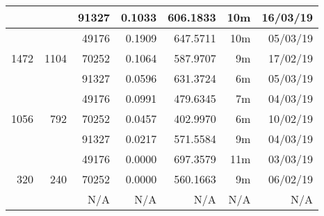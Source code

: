 \begin{center}
\begin{tabular}{ r r r | r | r r r }
  & & 91327 & 0.1033 & 606.1833 & 10m & 16/03/19 \\
  \hline
  \multirow{3}{*}{1472} & \multirow{3}{*}{1104} & 49176 & 0.1909 & 647.5711 & 10m & 05/03/19 \\
  & & 70252 & 0.1064 & 587.9707 & 9m & 17/02/19 \\
  & & 91327 & 0.0596 & 631.3724 & 6m & 05/03/19 \\
  \hline
  \multirow{3}{*}{1056} & \multirow{3}{*}{792} & 49176 & 0.0991 & 479.6345 & 7m & 04/03/19 \\
  & & 70252 & 0.0457 & 402.9970 & 6m & 10/02/19 \\
  & & 91327 & 0.0217 & 571.5584 & 9m & 04/03/19 \\
  \hline
  \multirow{3}{*}{320} & \multirow{3}{*}{240} & 49176 & 0.0000 & 697.3579 & 11m & 03/03/19 \\
  & & 70252 & 0.0000 & 560.1663 & 9m & 06/02/19 \\
  & & N/A & N/A & N/A & N/A & N/A \\
  \end{tabular}
  \end{center}